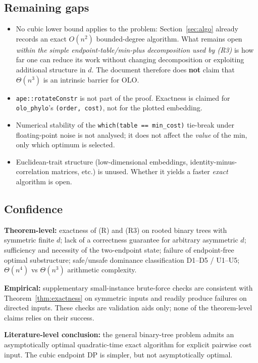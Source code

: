 \documentclass[11pt]{article}
\theoremstyle{plain}
\begin{document}
\subsection{Remaining gaps}

\begin{itemize}
\item No cubic lower bound applies to the problem: Section~\ref{sec:algo}
  already records an exact \(O(n^2)\) bounded-degree algorithm. What remains
  open \emph{within the simple endpoint-table/min-plus decomposition used by
  (R3)} is how far one can reduce its work without changing decomposition or
  exploiting additional structure in \(d\). The document therefore does
  \textbf{not} claim that \(\Theta(n^3)\) is an intrinsic barrier for OLO.
\item \texttt{ape::rotateConstr} is not part of the proof. Exactness is claimed
  for \texttt{olo\_phylo}'s \texttt{(order, cost)}, not for the plotted
  embedding.
\item Numerical stability of the \texttt{which(table == min\_cost)} tie-break
  under floating-point noise is not analysed; it does not affect the
  \emph{value} of the min, only which optimum is selected.
\item Euclidean-trait structure (low-dimensional embeddings,
  identity-minus-correlation matrices, etc.) is unused. Whether it yields a
  faster \emph{exact} algorithm is open.
\end{itemize}

\subsection{Confidence}

\textbf{Theorem-level:} exactness of (R) and (R3) on rooted binary trees with
symmetric finite \(d\); lack of a correctness guarantee for arbitrary
asymmetric \(d\); sufficiency and necessity of the two-endpoint state; failure
of endpoint-free optimal substructure; safe/unsafe dominance classification
D1--D5 / U1--U5; \(\Theta(n^4)\) vs \(\Theta(n^3)\) arithmetic complexity.

\textbf{Empirical:} supplementary small-instance brute-force checks are
consistent with Theorem~\ref{thm:exactness} on symmetric inputs and readily
produce failures on directed inputs. These checks are validation aids only;
none of the theorem-level claims relies on their success.

\textbf{Literature-level conclusion:} the general binary-tree problem admits an
asymptotically optimal quadratic-time exact algorithm for explicit pairwise
cost input. The cubic endpoint DP is simpler, but not asymptotically optimal.
\end{document}
